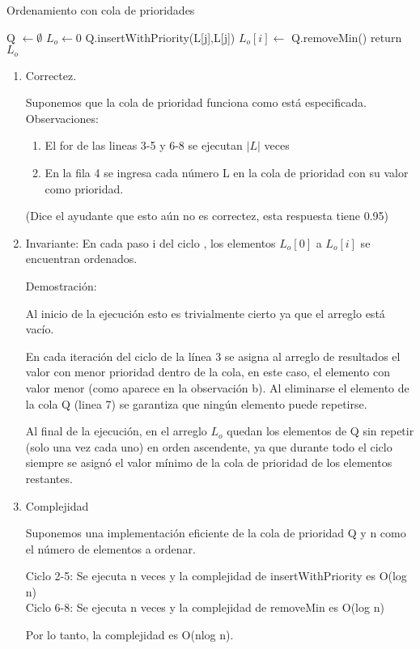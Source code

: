 \documentclass[9pt,spanish]{article}
\numberwithin{equation}{section}
\begin{document}
\begin{algorithm}[H]
	\caption{Ordenamiento con cola de prioridades}
	\begin{algorithmic}[1]
	\State Q $\leftarrow \emptyset$
	\State $L_o \leftarrow 0$
	\State	Q.insertWithPriority(L[j],L[j])  
	\EndFor
	\State	$L_o[i] \leftarrow$ Q.removeMin()  
	\EndFor	
	\State	return $L_o$
		
	\end{algorithmic}
\end{algorithm}
\begin{enumerate}
\item Correctez.

Suponemos que la cola de prioridad funciona como está especificada.\\
Observaciones: 
\begin{enumerate}
\item El for de las lineas 3-5 y 6-8 se ejecutan $|L|$ veces
\item  En la fila 4 se ingresa cada número L en la cola de prioridad con su valor como prioridad.
\end{enumerate}
(Dice el ayudante que esto aún no es correctez, esta respuesta tiene 0.95)
\item  Invariante: 
En cada paso i del ciclo , los elementos $L_o[0]$ a $L_o[i]$ se encuentran ordenados.

Demostración:

Al inicio de la ejecución esto es trivialmente cierto ya que el arreglo está vacío.

En cada iteración del ciclo de la línea 3 se asigna al arreglo de resultados el valor con menor prioridad dentro de la cola, en este caso, el elemento con valor menor (como aparece en la observación b).  Al eliminarse el elemento de la cola Q (linea 7) se garantiza que ningún elemento puede repetirse.

Al final de la ejecución, en el arreglo $L_o$ quedan los elementos de Q sin repetir (solo una vez cada uno) en orden ascendente, ya que durante todo el ciclo siempre se asignó el valor mínimo de la cola de prioridad  de los elementos restantes.

\item Complejidad

Suponemos una implementación eficiente de la cola de prioridad Q y n como el número de 	elementos a ordenar.

Ciclo 2-5: Se ejecuta n veces y la complejidad de insertWithPriority es O(log n) \\
Ciclo 6-8: Se ejecuta n veces y la complejidad de removeMin es O(log n)

Por lo tanto, la complejidad es O(nlog n).



\end{enumerate}
\end{document}
